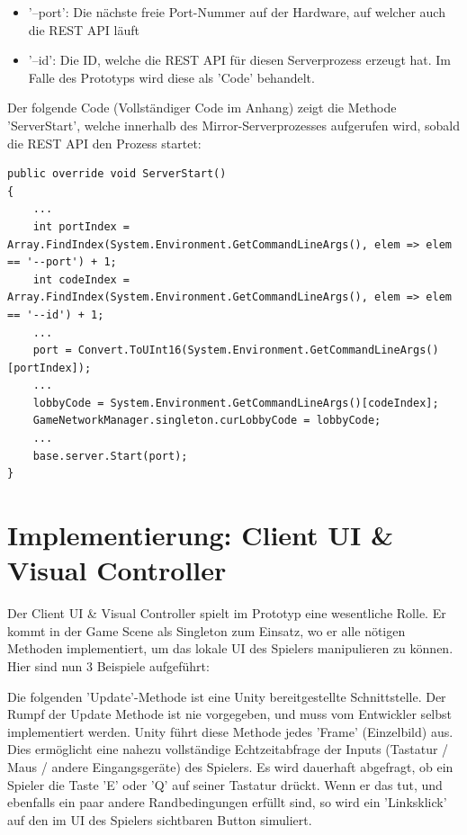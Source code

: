 \begin{itemize}
	\item '--port': Die nächste freie Port-Nummer auf der Hardware, auf welcher auch die REST API läuft
	\item '--id': Die ID, welche die REST API für diesen Serverprozess erzeugt hat. Im Falle des Prototyps wird diese als 'Code' behandelt.
\end{itemize}

Der folgende Code (Vollständiger Code im Anhang) zeigt die Methode 'ServerStart', welche innerhalb des Mirror-Serverprozesses aufgerufen wird, sobald die REST API den Prozess startet: 

\begin{lstlisting}[caption= OwnKcpTransport.cs ServerStart()]
public override void ServerStart()
{
	...
	int portIndex = Array.FindIndex(System.Environment.GetCommandLineArgs(), elem => elem == '--port') + 1;
	int codeIndex = Array.FindIndex(System.Environment.GetCommandLineArgs(), elem => elem == '--id') + 1;
	...
	port = Convert.ToUInt16(System.Environment.GetCommandLineArgs()[portIndex]);
	...
	lobbyCode = System.Environment.GetCommandLineArgs()[codeIndex];
	GameNetworkManager.singleton.curLobbyCode = lobbyCode;
	...
	base.server.Start(port);
}
\end{lstlisting}


\section{Implementierung: Client UI \& Visual Controller}
\label{implementierung:client_UI_Controller}

Der Client UI \& Visual Controller spielt im Prototyp eine wesentliche Rolle. Er kommt in der Game Scene als Singleton \cite{M.Gatrell.2009} zum Einsatz, wo er alle nötigen Methoden implementiert, um das lokale UI des Spielers manipulieren zu können. Hier sind nun 3 Beispiele aufgeführt:

Die folgenden 'Update'-Methode ist eine Unity bereitgestellte Schnittstelle. Der Rumpf der Update Methode ist nie vorgegeben, und muss vom Entwickler selbst implementiert werden. Unity führt diese Methode jedes 'Frame' (Einzelbild) \cite{Wikipedia.2021j} aus. Dies ermöglicht eine nahezu vollständige Echtzeitabfrage der Inputs (Tastatur / Maus / andere Eingangsgeräte) des Spielers. Es wird dauerhaft abgefragt, ob ein Spieler die Taste 'E' oder 'Q' auf seiner Tastatur drückt. Wenn er das tut, und ebenfalls ein paar andere Randbedingungen erfüllt sind, so wird ein 'Linksklick' auf den im UI des Spielers sichtbaren Button simuliert.

